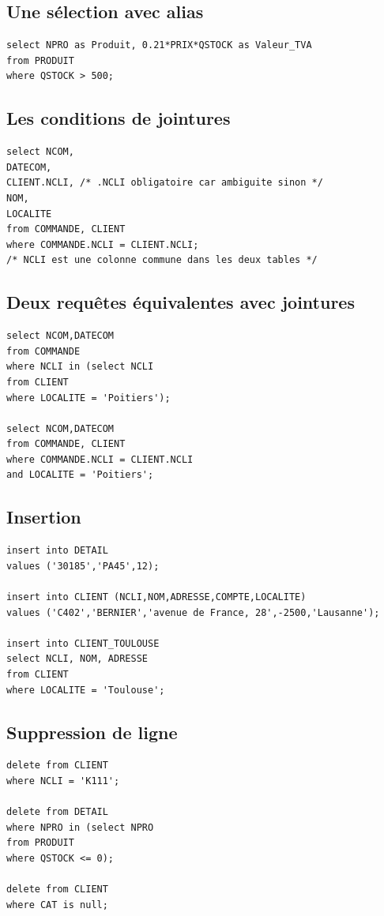\subsection{Une sélection avec alias}
\begin{lstlisting}
select NPRO as Produit, 0.21*PRIX*QSTOCK as Valeur_TVA
from PRODUIT
where QSTOCK > 500;
\end{lstlisting}

\subsection{Les conditions de jointures}
\begin{lstlisting}
select NCOM,
DATECOM,
CLIENT.NCLI, /* .NCLI obligatoire car ambiguite sinon */
NOM,
LOCALITE
from COMMANDE, CLIENT
where COMMANDE.NCLI = CLIENT.NCLI;
/* NCLI est une colonne commune dans les deux tables */
\end{lstlisting}

\subsection{Deux requêtes équivalentes avec jointures}
\begin{lstlisting}
select NCOM,DATECOM
from COMMANDE
where NCLI in (select NCLI
from CLIENT
where LOCALITE = 'Poitiers');

select NCOM,DATECOM
from COMMANDE, CLIENT
where COMMANDE.NCLI = CLIENT.NCLI
and LOCALITE = 'Poitiers';
\end{lstlisting}

\subsection{Insertion}
\begin{lstlisting}
insert into DETAIL
values ('30185','PA45',12);

insert into CLIENT (NCLI,NOM,ADRESSE,COMPTE,LOCALITE)
values ('C402','BERNIER','avenue de France, 28',-2500,'Lausanne');

insert into CLIENT_TOULOUSE
select NCLI, NOM, ADRESSE
from CLIENT
where LOCALITE = 'Toulouse';
\end{lstlisting}

\subsection{Suppression de ligne}
\begin{lstlisting}
delete from CLIENT
where NCLI = 'K111';

delete from DETAIL
where NPRO in (select NPRO
from PRODUIT
where QSTOCK <= 0);

delete from CLIENT
where CAT is null;
\end{lstlisting}


